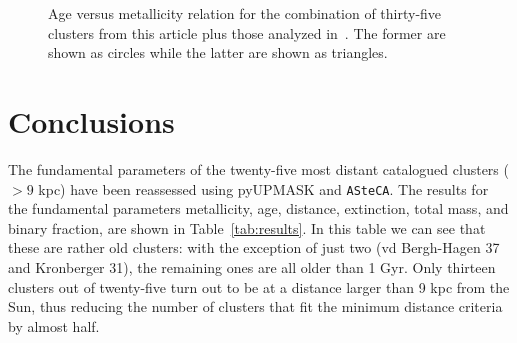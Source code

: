 \documentclass[draft]{aa}
\begin{document}
  \begin{figure}
   \caption{Age versus metallicity relation for the combination of thirty-five
   clusters from this article plus those analyzed in~\cite{Perren_2020}. The
   former are shown as circles while the latter are shown as triangles.}
   \label{fig:age_vs_feh}
  \end{figure}








\section{Conclusions}
 \label{sec:conclusions}

  The fundamental parameters of the twenty-five most distant catalogued clusters
  ($>9$ kpc) have been reassessed using pyUPMASK and \texttt{ASteCA}. The
  results for the fundamental parameters metallicity, age, distance,
  extinction, total mass, and binary fraction, are shown in 
  Table~\ref{tab:results}. In this table we can see that these are
  rather old clusters: with the exception of just two (vd Bergh-Hagen 37 and
  Kronberger 31), the remaining ones are all older than 1 Gyr.
  Only thirteen clusters out of twenty-five turn out to be at a distance larger
  than 9 kpc from the Sun, thus reducing the number of clusters that fit the
  minimum distance criteria by almost half.
\end{document}
